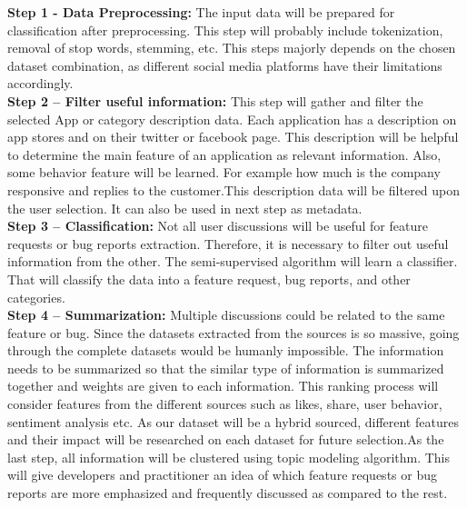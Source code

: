 \textbf{Step 1 - Data Preprocessing:} The input data will be prepared for classification after preprocessing. This step will probably include tokenization, removal of stop words, stemming, etc. This steps majorly depends on the chosen dataset combination, as different social media platforms have their limitations accordingly.\\

\textbf{Step 2 –  Filter useful information:} This step will gather and filter the selected App or category description data. Each application has a description on app stores and on their twitter or facebook page. This description will be helpful to determine the main feature of an application as relevant information. Also, some behavior feature will be learned.  For example how much is the company responsive and replies to the customer.This description data will be filtered upon the user selection. It can also be used in next step as metadata.\\

\textbf{Step 3 –  Classification:} Not all user discussions will be useful for feature requests or bug reports extraction. Therefore, it is necessary to filter out useful information from the other. The semi-supervised algorithm will learn a classifier. That will classify the data into a feature request, bug reports, and other categories.\\

\textbf{Step 4 – Summarization: } Multiple discussions could be related to the same feature or bug.
Since the datasets extracted from the sources is so massive, going through the complete datasets
would be humanly impossible. The information needs to be summarized so that the similar type
of information is summarized together and weights are given to each information. This ranking process will consider features from the different sources such as likes, share, user behavior, sentiment analysis etc. As our dataset will be a hybrid sourced, different features and their impact will be researched on each dataset for future selection.As the last step, all information will be clustered using topic modeling algorithm. This will
give developers and practitioner an idea of which feature requests or bug reports are more emphasized and frequently discussed as compared to the rest.\\

